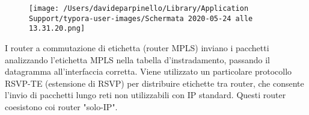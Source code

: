 \documentclass[
]{article}
\begin{document}
\begin{figure}
\centering
\texttt{[image: /Users/davideparpinello/Library/Application Support/typora-user-images/Schermata 2020-05-24 alle 13.31.20.png]}
\caption{}
\end{figure}

I router a commutazione di etichetta (router MPLS) inviano i pacchetti
analizzando l'etichetta MPLS nella tabella d'instradamento, passando il
datagramma all'interfaccia corretta. Viene utilizzato un particolare
protocollo RSVP-TE (estensione di RSVP) per distribuire etichette tra
router, che consente l'invio di pacchetti lungo reti non utilizzabili
con IP standard. Questi router coesistono coi router "solo-IP".
\end{document}
